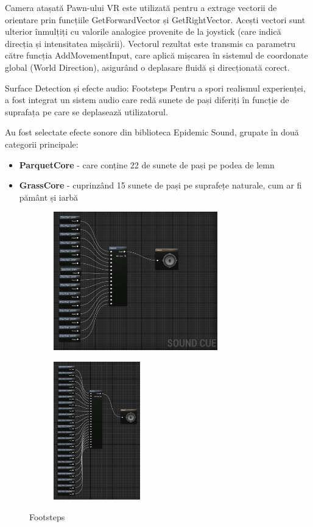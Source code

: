 Camera atașată Pawn-ului VR este utilizată pentru a extrage vectorii de orientare prin funcțiile GetForwardVector și GetRightVector. Acești vectori sunt ulterior înmulțiți cu valorile analogice provenite de la joystick (care indică direcția și intensitatea mișcării). Vectorul rezultat este transmis ca parametru către funcția AddMovementInput, care aplică mișcarea în sistemul de coordonate global (World Direction), asigurând o deplasare fluidă și direcționată corect.

Surface Detection și efecte audio: Footsteps
Pentru a spori realismul experienței, a fost integrat un sistem audio care redă sunete de pași diferiți în funcție de suprafața pe care se deplasează utilizatorul.

Au fost selectate efecte sonore din biblioteca Epidemic Sound, grupate în două categorii principale:
\begin{itemize}
\item \textbf{ParquetCore} - care conține 22 de sunete de pași pe podea de lemn
\item \textbf{GrassCore} - cuprinzând 15 sunete de pași pe suprafețe naturale, cum ar fi pământ și iarbă
\end{itemize}

\begin{figure}[h!]
    \centering
    \begin{subfigure}{0.49\textwidth}
        \includegraphics[width=\linewidth, height=6cm]{continut/capitol3/figuri/step_grass.png}
        \label{fig:VR_Pawn}
    \end{subfigure}
    \hfill
    \begin{subfigure}{0.49\textwidth}
        \includegraphics[width=\linewidth, height=6cm]{continut/capitol3/figuri/step_wood.png}
        \label{fig:VR_Pawn}
    \end{subfigure}
    \caption{Footsteps}
\end{figure}

